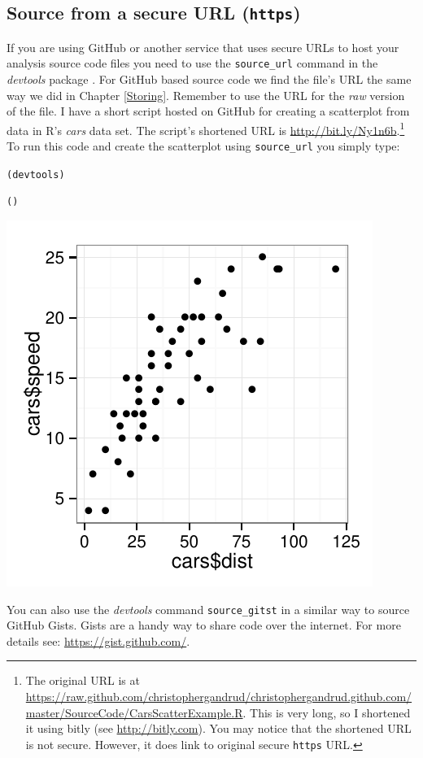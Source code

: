 \subsection{Source from a secure URL (\texttt{https})}

If you are using GitHub or another service that uses secure URLs to host your analysis source code files you need to use the \texttt{source\_url} command in the {\emph{devtools}} package \cite[]{R-devtools}. For GitHub based source code we find the file's URL the same way we did in Chapter \ref{Storing}. Remember to use the URL for the {\emph{raw}} version of the file. I have a short script hosted on GitHub for creating a scatterplot from data in R's {\emph{cars}} data set. The script's shortened URL is \url{http://bit.ly/Ny1n6b}.\footnote{The original URL is at \url{https://raw.github.com/christophergandrud/christophergandrud.github.com/master/SourceCode/CarsScatterExample.R}. This is very long, so I shortened it using bitly (see \url{http://bitly.com}). You may notice that the shortened URL is not secure. However, it does link to original secure {\tt{https}} URL.} To run this code and create the scatterplot using {\tt{source\_url}} you simply type:

\begin{knitrout}
\color{fgcolor}\begin{kframe}
\begin{alltt}
(devtools)

()
\end{alltt}
\end{kframe}

{\centering \includegraphics[width=\maxwidth]{figure/Ch8SourceURLExample} 

}


\end{knitrout}


\noindent You can also use the {\emph{devtools}} command \texttt{source\_gitst} in a similar way to source GitHub Gists. Gists are a handy way to share code over the internet. For more details see: \url{https://gist.github.com/}.

